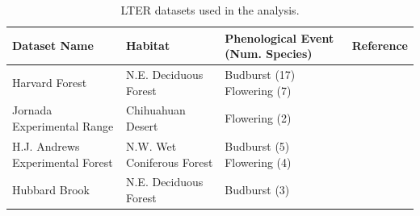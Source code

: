 
\begin{table}
    \caption[LTER datasets used in the analysis]{LTER datasets used in the analysis.} \label{table-2-1}
    \begin{tabularx}{6.5in}{XXXX}
    \hline
    Dataset Name & Habitat &  Phenological Event (Num. Species) & Reference \\ \hline
    Harvard Forest & N.E. Deciduous Forest & Budburst (17) Flowering (7) & \citep{okeefe2015} \\
    Jornada Experimental Range & Chihuahuan Desert & Flowering (2) &  \\
    H.J. Andrews Experimental Forest & N.W. Wet Coniferous Forest & Budburst (5) Flowering (4) & \citep{schulze2017} \\
    Hubbard Brook & N.E. Deciduous Forest & Budburst (3) & \citep{bailey2018} \\
    \hline
    \end{tabularx}
\end{table}

\newpage

